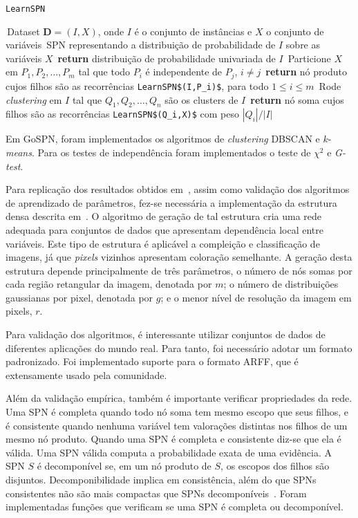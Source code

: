 \documentclass[12pt]{article}
\theoremstyle{plain}
\numberwithin{equation}{section}
\newcommand{\code}[1]{\lstinline[mathescape=true]{#1}}
\newcommand{\mcode}[1]{\lstinline[mathescape]!#1!}
\begin{document}
\begin{algorithm}[H]
  \caption*{\code{LearnSPN}~\cite{gens-domingos}}
  \begin{algorithmic}[1]
    \Require\,Dataset $\mathbf{D}=(I,X)$, onde $I$ é o conjunto de instâncias e $X$ o conjunto de
    variáveis
    \Ensure\,SPN representando a distribuição de probabilidade de $I$ sobre as variáveis $X$
      \State\,\textbf{return} distribuição de probabilidade univariada de $I$
    \Else%
      \State\,Particione $X$ em $P_1,P_2,\ldots,P_m$ tal que todo $P_i$ é independente de $P_j$,
      $i\neq j$
        \State\,\textbf{return} nó produto cujos filhos são as recorrências
        \mcode{LearnSPN$(I,P_i)$}, para todo $1\leq i\leq m$
      \Else%
        \State\,Rode \textit{clustering} em $I$ tal que $Q_1,Q_2,\ldots,Q_n$ são os clusters de $I$
        \State\,\textbf{return} nó soma cujos filhos são as recorrências \mcode{LearnSPN$(Q_i,X)$}
        com peso $|Q_i|/|I|$
      \EndIf%
    \EndIf%
  \end{algorithmic}
\end{algorithm}

Em GoSPN, foram implementados os algoritmos de \textit{clustering} DBSCAN e $k$-\textit{means}.
Para os testes de independência foram implementados o teste de $\chi^2$ e \textit{G-test}.

Para replicação dos resultados obtidos em~\cite{poon-domingos}, assim como validação dos algoritmos
de aprendizado de parâmetros, fez-se necessária a implementação da estrutura densa descrita
em~\cite{poon-domingos}. O algoritmo de geração de tal estrutura cria uma rede adequada para
conjuntos de dados que apresentam dependência local entre variáveis. Este tipo de estrutura é
aplicável a compleição e classificação de imagens, já que \textit{pixels} vizinhos apresentam
coloração semelhante. A geração desta estrutura depende principalmente de três parâmetros, o número
de nós somas por cada região retangular da imagem, denotada por $m$; o número de distribuições
gaussianas por pixel, denotada por $g$; e o menor nível de resolução da imagem em pixels, $r$.

Para validação dos algoritmos, é interessante utilizar conjuntos de dados de diferentes aplicações
do mundo real. Para tanto, foi necessário adotar um formato padronizado. Foi implementado suporte
para o formato ARFF, que é extensamente usado pela comunidade.

Além da validação empírica, também é importante verificar propriedades da rede. Uma SPN é completa
quando todo nó soma tem mesmo escopo que seus filhos, e é consistente quando nenhuma variável tem
valorações distintas nos filhos de um mesmo nó produto. Quando uma SPN é completa e consistente
diz-se que ela é válida. Uma SPN válida computa a probabilidade exata de uma evidência. A SPN $S$ é
decomponível se, em um nó produto de $S$, os escopos dos filhos são disjuntos. Decomponibilidade
implica em consistência, além do que SPNs consistentes não são mais compactas que SPNs
decomponíveis~\cite{theoretical-spn}. Foram implementadas funções que verificam se uma SPN é
completa ou decomponível.
\end{document}
